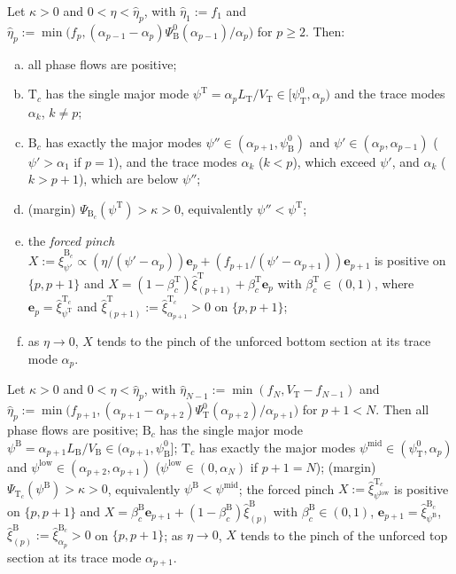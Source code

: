\documentclass[11pt,a4paper]{report}
\newcommand{\bfe}{\mathbf e}
\newcommand{\Ts}{\mathrm T}
\newcommand{\Bs}{\mathrm B}
\begin{document}
\begin{proposition}\label{prop:Bforced}
Let \(\kappa>0\) and \(0<\eta<\hat\eta_p\), with \(\hat\eta_1:=f_1\) and
\(\hat\eta_p:=\min\bigl(f_p,(\alpha_{p-1}-\alpha_p)\Psi^0_\Bs(\alpha_{p-1})/\alpha_p\bigr)\) for \(p\ge2\). Then:
\begin{enumerate}[(a)]
\item all phase flows are positive;
\item \(\Ts_c\) has the single major mode \(\psi^\Ts=\alpha_pL_\Ts/V_\Ts\in[\psi^0_\Ts,\alpha_p)\) and the trace modes \(\alpha_k\), \(k\ne p\);
\item \(\Bs_c\) has exactly the major modes \(\psi''\in(\alpha_{p+1},\psi^0_\Bs)\) and \(\psi'\in(\alpha_p,\alpha_{p-1})\) (\(\psi'>\alpha_1\) if
\(p=1\)), and the trace modes \(\alpha_k\) (\(k<p\)), which exceed \(\psi'\), and \(\alpha_k\) (\(k>p+1\)), which are below \(\psi''\);
\item (margin) \(\Psi_{\Bs_c}(\psi^\Ts)>\kappa>0\), equivalently \(\psi''<\psi^\Ts\);
\item the \emph{forced pinch} \(X:=\hat\xi^{\Bs_c}_{\psi'}\propto(\eta/(\psi'-\alpha_p))\bfe_p+(f_{p+1}/(\psi'-\alpha_{p+1}))\bfe_{p+1}\) is
positive on \(\{p,p+1\}\) and \(X=(1-\beta^\Ts_c)\hat\xi^\Ts_{(p+1)}+\beta^\Ts_c\bfe_p\) with \(\beta^\Ts_c\in(0,1)\), where
\(\bfe_p=\hat\xi^{\Ts_c}_{\psi^\Ts}\) and \(\hat\xi^\Ts_{(p+1)}:=\hat\xi^{\Ts_c}_{\alpha_{p+1}}>0\) on \(\{p,p+1\}\);
\item as \(\eta\to0\), \(X\) tends to the pinch of the unforced bottom section at its trace mode \(\alpha_p\).
\end{enumerate}
\end{proposition}

\begin{proposition}\label{prop:Tforced}
Let \(\kappa>0\) and \(0<\eta<\hat\eta_p\), with \(\hat\eta_{N-1}:=\min(f_N,V_\Ts-f_{N-1})\) and
\(\hat\eta_p:=\min\bigl(f_{p+1},(\alpha_{p+1}-\alpha_{p+2})\Psi^0_\Ts(\alpha_{p+2})/\alpha_{p+1}\bigr)\) for \(p+1<N\). Then all phase
flows are positive; \(\Bs_c\) has the single major mode \(\psi^\Bs=\alpha_{p+1}L_\Bs/V_\Bs\in(\alpha_{p+1},\psi^0_\Bs]\); \(\Ts_c\) has
exactly the major modes \(\psi^{\mathrm{mid}}\in(\psi^0_\Ts,\alpha_p)\) and \(\psi^{\mathrm{low}}\in(\alpha_{p+2},\alpha_{p+1})\)
(\(\psi^{\mathrm{low}}\in(0,\alpha_N)\) if \(p+1=N\)); (margin) \(\Psi_{\Ts_c}(\psi^\Bs)>\kappa>0\), equivalently
\(\psi^\Bs<\psi^{\mathrm{mid}}\); the forced pinch \(X:=\hat\xi^{\Ts_c}_{\psi^{\mathrm{low}}}\) is positive on \(\{p,p+1\}\) and
\(X=\beta^\Bs_c\bfe_{p+1}+(1-\beta^\Bs_c)\hat\xi^\Bs_{(p)}\) with \(\beta^\Bs_c\in(0,1)\), \(\bfe_{p+1}=\hat\xi^{\Bs_c}_{\psi^\Bs}\),
\(\hat\xi^\Bs_{(p)}:=\hat\xi^{\Bs_c}_{\alpha_p}>0\) on \(\{p,p+1\}\); as \(\eta\to0\), \(X\) tends to the pinch of the unforced top
section at its trace mode \(\alpha_{p+1}\).
\end{proposition}
\end{document}
